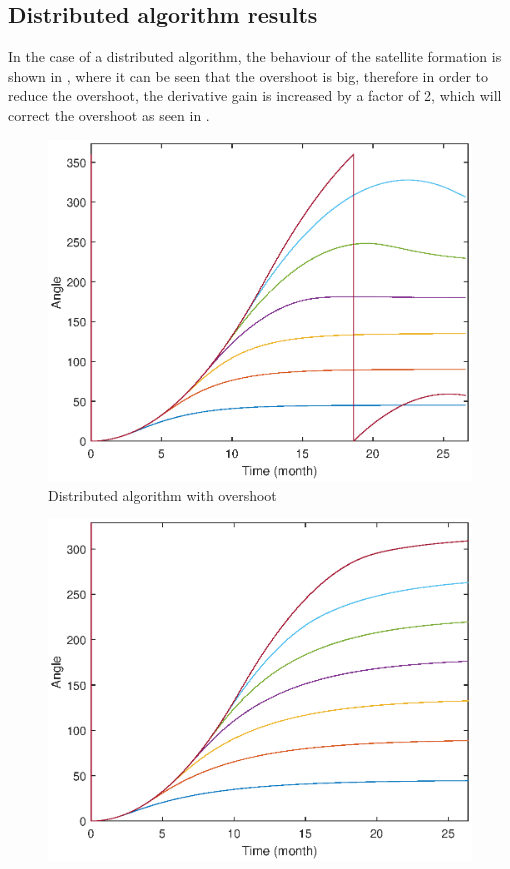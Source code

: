 \subsection{Distributed algorithm results}
In the case of a distributed algorithm, the behaviour of the satellite formation is shown in , where it can be seen that the overshoot is big, therefore in order to reduce the overshoot, the derivative gain is increased by a factor of 2, which will correct the overshoot as seen in  .
\begin{table}[H]
	\begin{minipage}[b]{0.49\linewidth}
		\centering
		\begin{figure}[H]
			\centering
			\includegraphics[width=1.1\linewidth]{figures/da1.eps}
			\caption{ Distributed algorithm with overshoot }
			\label{fig:da1}
		\end{figure}
	\end{minipage}\hfill
	\begin{minipage}[b]{0.49\linewidth}
		\centering
		\begin{figure}[H]
			\centering
			\includegraphics[width=1.1\linewidth]{figures/distributed_algo.eps}

\end{figure}
\end{minipage}
\end{table}
